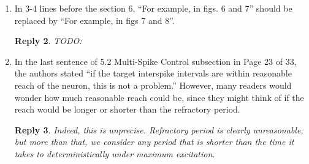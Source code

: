 \documentclass{article}
\newtheorem*{rep}{Reply}
\begin{document}
\begin{enumerate}
\begin{rep}
Unfortunately, averaging $\alpha(X_t,t)$ over the different tracking trains
is not particularly sensible. In particular consider the case when one
tracking train has just spiked, while the other is delayed. Then the average
of the controls will be zero, even though one is max and the other is min. As
showing an average seems uninformative of what is going on. 

Instead we show one closed-loop / open-loop full-train realization of the
voltage / control signal, $X_t, \alpha(X_t, t)$ for a
single train in figure \ref{fig:tracking_train_trajectories}. In a sense this is
just 16 copies glued side-by-side of the realizations we see in section 5.1.

\begin{figure}[htp]
\begin{center}
\\
  \caption[labelInTOC]{Full Tracking Train trajectories for $X_t$,
  $\alpha(X_t,t)$}
  \label{fig:tracking_train_trajectories}
\end{center}
\end{figure}

\end{rep}

\item In 3-4 lines before the section 6, “For example, in figs. 6 and 7” should be
replaced by “For example, in figs 7 and 8”.
\begin{rep}
TODO:
\end{rep}

\item In the last sentence of 5.2 Multi-Spike Control subsection in Page 23 of 33,
the authors stated “if the target interspike intervals are within reasonable
reach of the neuron, this is not a problem.” However, many readers would wonder
how much reasonable reach could be, since they might think of if the reach would
be longer or shorter than the refractory period.
\begin{rep}

Indeed, this is unprecise. Refractory period is clearly unreasonable, but more
than that, we consider any period that is shorter than the time it takes to
deterministically under maximum excitation. 


\end{rep}
\end{enumerate}
\end{document}
